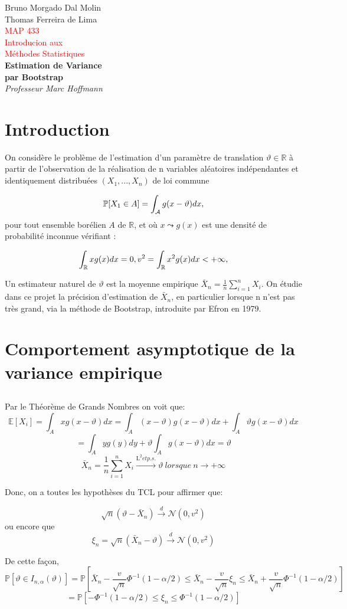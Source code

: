 \documentclass{article}
\newcommand{\mean}{\mathbb{E}}
\newcommand*{\plogo}{\fbox{$\mathcal{PL}$}} %
\newcommand*{\titleTH}{\begingroup %
\raggedleft %
\vspace*{\baselineskip} %

{\Large Bruno Morgado Dal Molin \\ Thomas Ferreira de Lima}\\[0.167\textheight] %

{\textcolor{Red}{\huge MAP 433 \\Introducion aux \\ Méthodes Statistiques}}\\[\baselineskip] %

{\LARGE\bfseries Estimation de Variance \\par Bootstrap}\\[\baselineskip] %

{\Large \textit{Professeur Marc Hoffmann}}\par %

\vfill %
\vspace{2in}

\vspace*{3\baselineskip} %
\endgroup}
\begin{document}
\pagestyle{empty} %

\titleTH %


\section {Introduction}
	On considère le problème de l'estimation d'un paramètre de translation $\displaystyle \vartheta\in\mathbb{R}$
à partir de l'observation de la réalisation de n variables aléatoires indépendantes et identiquement distribuées
$\displaystyle (X_1,...,X_n)$ de loi commune

$$ \mathbb{P}[X_1\in A]= \int_{\cal A} g(x-\vartheta)dx,$$
pour tout ensemble borélien $\displaystyle A $ de $\displaystyle \mathbb{R}$, et où $\displaystyle x \leadsto g(x)$ est une densité de   probabilité inconnue vérifiant :

$$ \int_{\cal \mathbb{R}} xg(x)dx =0 , v^2 = \int_{\cal \mathbb{R}} x^2g(x)dx < +\infty,$$

Un estimateur naturel de $\displaystyle \vartheta$ est la moyenne empirique $\displaystyle \bar X_n = \frac{1}{n} \sum_{i=1}^n X_i$. On étudie dans ce projet la précision
d'estimation de $\displaystyle \bar X_n$, en particulier lorsque n n'est pas très grand, via la méthode de Bootstrap, introduite par Efron en 1979.
\section {Comportement asymptotique de la variance empirique}
\subsection{}
Par le Théorème de Grands Nombres on voit que:
$$\mean [X_i] = \int_{A}xg(x-\vartheta)dx=\int_{A}(x-\vartheta)g(x-\vartheta)dx+\int_{A}\vartheta g(x-\vartheta)dx$$
$$=\int_{A}y g(y)dy+\vartheta\int_{A}g(x-\vartheta)dx= \vartheta$$
$$\bar X_n = \frac{1}{n}\sum_{i=1}^nX_i  \overset{\mathrm{{L}^2} et p.s.}{\longrightarrow}\vartheta \ lorsque\ n \rightarrow +\infty $$

Donc, on a toutes les hypothèses du TCL pour affirmer que:

$$\sqrt{n}(\vartheta - \bar X_n) \overset{d}{\longrightarrow} \mathcal{N} (0, v^2) $$
ou encore que $$\xi_n = \sqrt{n}(\bar X_n - \vartheta) \overset{d}{\longrightarrow} \mathcal{N} (0, v^2) $$

De cette façon, $$\mathbb{P}[\vartheta \in I_{n,\alpha}(\vartheta)]= \mathbb{P}[\bar X_n-\frac{v}{\sqrt{n}}\Phi^{-1}(1-\alpha/2)\leq \bar X_n-\frac{v}{\sqrt{n}}\xi_n\leq\bar X_n+\frac{v}{\sqrt{n}}\Phi^{-1}(1-\alpha/2)]$$
$$=\mathbb{P}[-\Phi^{-1}(1-\alpha/2)\leq \xi_n \leq\Phi^{-1}(1-\alpha/2)]$$
\end{document}
